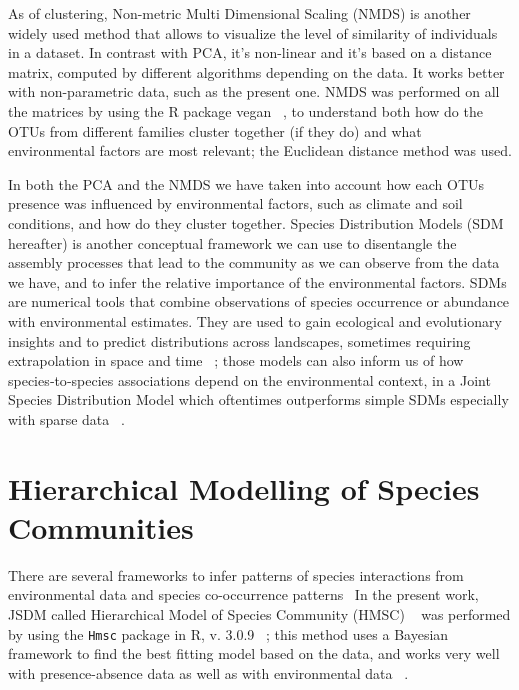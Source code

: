 As of clustering, Non-metric Multi Dimensional Scaling (NMDS) is another widely used method that allows to visualize the level of similarity of individuals in a dataset. In contrast with PCA, it's non-linear and it's based on a distance matrix, computed by different algorithms depending on the data. It works better with non-parametric data, such as the present one. NMDS was performed on all the matrices by using the R package vegan ~\citep{dixon2003a}, to understand both how do the OTUs from different families cluster together (if they do) and what environmental factors are most relevant; the Euclidean distance method was used.

In both the PCA and the NMDS we have taken into account how each OTUs presence was influenced by environmental factors, such as climate and soil conditions, and how do they cluster together.
Species Distribution Models (SDM hereafter) is another conceptual framework we can use to disentangle the assembly processes that lead to the community as we can observe from the data we have, and to infer the relative importance of the environmental factors. SDMs are numerical tools that combine observations of species occurrence or abundance with environmental estimates. They are used to gain ecological and evolutionary insights and to predict distributions across landscapes, sometimes requiring extrapolation in space and time ~\citep{elith2009}; those models can also inform us of how species‐to‐species associations depend on the environmental context, in a Joint Species Distribution Model which oftentimes outperforms simple SDMs especially with sparse data ~\citep{pollock2014, tikhonov2017}.

\chapter{Hierarchical Modelling of Species Communities}
\label{hierarchicalmodellingofspeciescommunities}

There are several frameworks to infer patterns of species interactions from environmental data and species co-occurrence patterns~\citep{pollock2014, warton2015}
In the present work, JSDM called Hierarchical Model of Species Community (HMSC) ~\citep{ovaskainen2017} was performed by using the \texttt{Hmsc} package in R, v. 3.0.9 ~\citep{tikhonov2020, hmsc-r2021}; this method uses a Bayesian framework to find the best fitting model based on the data, and works very well with presence-absence data as well as with environmental data ~\citep{hefley2016}.

